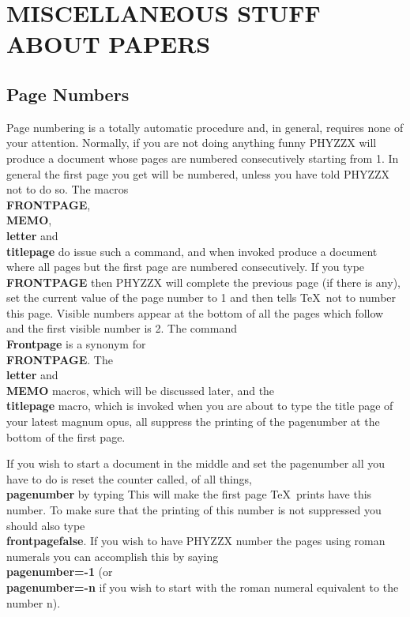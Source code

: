 \chapter{MISCELLANEOUS STUFF ABOUT PAPERS}
 
\section{Page Numbers}
 
Page numbering is a totally automatic procedure
and, in general, requires none of your attention.
Normally, if you are not doing anything funny PHYZZX will
produce a document whose pages are numbered consecutively
starting from 1.
In general the first page you get will be numbered, unless
you have told PHYZZX not to do so.
The macros {\bf \\FRONTPAGE}, {\bf \\MEMO}, {\bf \\letter}
and {\bf \\titlepage} do issue such a command, and when
invoked produce a document where all pages but the
first page are numbered consecutively.
If you type {\bf \\FRONTPAGE} then PHYZZX will complete the previous
page (if there is any), set the current value of the page number to
1 and then tells \TeX\ not to number this page.
Visible numbers appear at the bottom of all the pages which follow
and the first visible number is 2.
The command {\bf \\Frontpage} is a synonym for {\bf \\FRONTPAGE}.
The {\bf \\letter} and {\bf \\MEMO} macros, which
will be discussed later,
and the {\bf \\titlepage} macro, which is invoked when you are about
to type the title page of your latest magnum opus, all suppress
the printing of the pagenumber at the bottom of the first page.
 
If you wish to start a document in the middle and set the pagenumber
all you have to do is reset the counter called, of all things,
{\bf \\pagenumber} by typing
This will make the first page \TeX\ prints have this number.
To make sure that the printing of this number is not suppressed
you should also type {\bf \\frontpagefalse}.
If you wish to have PHYZZX number the pages using roman numerals
you can accomplish this by saying {\bf \\pagenumber=-1}
(or {\bf \\pagenumber=-n} if you wish to start with the roman
numeral equivalent to the number n).
 
